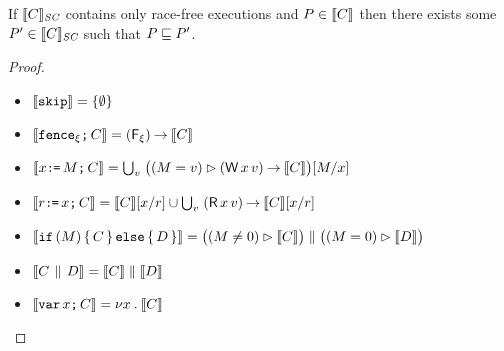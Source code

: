 \begin{theorem}
  If $\llbracket C\rrbracket_{\textit{SC}}$ contains only race-free executions and
  $P\in\llbracket C\rrbracket$ then there exists some $P'\in\llbracket C\rrbracket_{\textit{SC}}$ such
  that $P\sqsubseteq P'$.
\begin{proof}
  \begin{itemize}
  \item
    \begin{math}
      \llbracket\texttt{skip}\rrbracket
      =
      \{ \emptyset \} 
    \end{math}
  \item
    \begin{math}
      \llbracket\texttt{fence}_{\xi}\texttt{;}\, C\rrbracket
      =
      (\mathsf{F}_{\xi}) \mathbin\rightarrow \llbracket C\rrbracket
    \end{math}
  \item
    \begin{math}
      \sem{\aLoc\GETS\aExp\SEMI \aCmd}
      =
      \textstyle\bigcup_\aVal\; \bigl((\aExp=\aVal) \guard (\DW\aLoc\aVal) \prefix \sem{\aCmd}\bigr)[\aExp/\aLoc]
    \end{math}
  \item
    \begin{math}
      \sem{\aReg\GETS\aLoc\SEMI \aCmd}
      =
      \sem{\aCmd}[\aLoc/\aReg] \cup \textstyle\bigcup_\aVal\; (\DR\aLoc\aVal) \prefix \sem{\aCmd}[\aLoc/\aReg]
    \end{math}
  \item
    \begin{math}
      \llbracket\texttt{if}\, (M) \allowbreak\,\{\, C \,\}\,\allowbreak\texttt{else}\allowbreak\,\{\, D \,\}\rrbracket
      =
      \bigl((M \neq 0) \mathbin\rhd \llbracket C\rrbracket\bigr) \parallel \bigl((M=0) \mathbin\rhd \llbracket D\rrbracket\bigr)
    \end{math}
  \item
    \begin{math}
      \llbracket C \,\mathbin{\|}\, D\rrbracket
      =
      \llbracket C\rrbracket \parallel \llbracket D\rrbracket
    \end{math}
  \item
    \begin{math}
      \llbracket\texttt{var}\,x\texttt{;}\, C\rrbracket
      =
      \nu x \mathbin. \llbracket C\rrbracket
    \end{math}
\end{itemize}
  
\end{proof}
\end{theorem}


